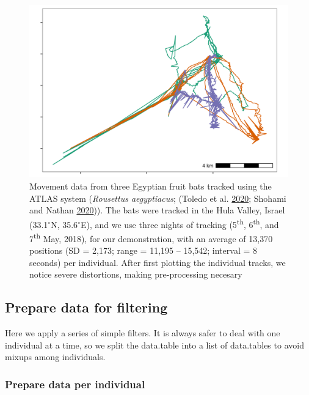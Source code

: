 \documentclass[
]{scrartcl}
\begin{document}
\begin{figure}
\centering
\includegraphics{figures/fig_bat_raw.png}
\caption{Movement data from three Egyptian fruit bats tracked using the ATLAS system (\emph{Rousettus aegyptiacus}; (Toledo et al. \protect\hyperlink{ref-toledo2020}{2020}; Shohami and Nathan \protect\hyperlink{ref-shohami2020}{2020})).
The bats were tracked in the Hula Valley, Israel (33.1\(^{\circ}\)N, 35.6\(^{\circ}\)E), and we use three nights of tracking (5\textsuperscript{th}, 6\textsuperscript{th}, and 7\textsuperscript{th} May, 2018), for our demonstration, with an average of 13,370 positions (SD = 2,173; range = 11,195 -- 15,542; interval = 8 seconds) per individual.
After first plotting the individual tracks, we notice severe distortions, making pre-processing necesary}
\end{figure}

\hypertarget{prepare-data-for-filtering}{%
\subsection{Prepare data for filtering}\label{prepare-data-for-filtering}}

Here we apply a series of simple filters.
It is always safer to deal with one individual at a time, so we split the data.table
into a list of data.tables to avoid mixups among individuals.

\hypertarget{prepare-data-per-individual}{%
\subsubsection{Prepare data per individual}\label{prepare-data-per-individual}}
\end{document}
